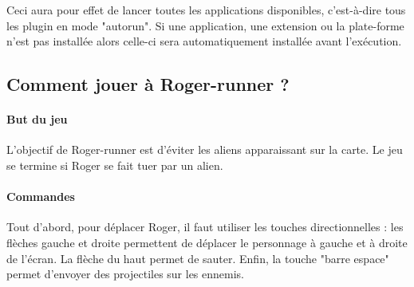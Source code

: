     Ceci aura pour effet de lancer toutes les applications disponibles, c'est-à-dire tous les plugin en mode "autorun". Si une application, une extension ou la plate-forme n'est pas installée alors celle-ci sera automatiquement installée avant l'exécution.
    
\subsection{Comment jouer à Roger-runner ?}
    \paragraph{But du jeu}
    L'objectif de Roger-runner est d'éviter les aliens apparaissant sur la carte. Le jeu se termine si Roger se fait tuer par un alien.
    
    \paragraph{Commandes}
    Tout d'abord, pour déplacer Roger, il faut utiliser les touches directionnelles : les flèches gauche et droite permettent de déplacer le personnage à gauche et à droite de l'écran. La flèche du haut permet de sauter. Enfin, la touche "barre espace" permet d'envoyer des projectiles sur les ennemis.
    
    